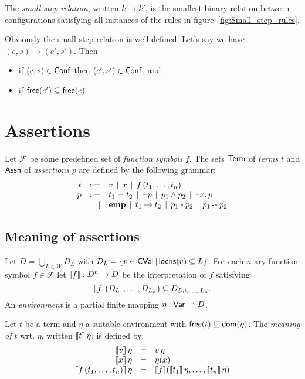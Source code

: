 \documentclass[12pt,a4paper]{article}
\newcommand{\CVal}{\sstyle{CVal}}
\newcommand{\Conf}{\sstyle{Conf}}
\newcommand{\emp}{\ensuremath{\mathbf{emp}}}
\begin{document}
\begin{definition}
  The {\em small step relation}, written $k \to k'$, is the smallest binary relation between configurations
  satisfying all instances of the rules in figure~\ref{fig:Small_step_rules}.
\end{definition}

Obviously the small step relation is well-defined. Let's say we have $(e,s)\to(e',s')$. Then
\begin{itemize}
\item if $(e,s)\in\Conf$ then $(e',s')\in\Conf$, and
\item if $\mathsf{free}(e') \subseteq \mathsf{free}(e)$.
\end{itemize}


\section{Assertions}

\begin{definition}[Assertions]
  Let $\mathcal{F}$ be some predefined set of {\em function symbols} $f$.
  The sets $\mathsf{Term}$ of {\em terms} $t$ and $\mathsf{Assn}$ of {\em assertions} $p$ are defined by the following grammar:
  \[\GRbeg
  t \GRis v \GRmid x \GRmid f\,(t_1,\ldots,t_n)
  \\
  p \GRis t_1 = t_2 \GRmid \neg p \GRmid p_1 \wedge p_2 \GRmid \exists x.\,p
  \GRal \emp \GRmid t_1 \mapsto t_2 \GRmid p_1 \sepcon p_2 \GRmid p_1 \sepimp p_2
  \GRend\]
\end{definition}


\subsection{Meaning of assertions}

Let $D = \bigcup_{L\in W} D_L$ with $D_L = \{v\in\CVal\,|\,\locns{v} \subseteq L\}$.
For each $n$-ary function symbol $f\in\mathcal{F}$ let
$\llbracket f\rrbracket: D^n \to D$ be the interpretation of $f$ satisfying
\[
\llbracket f\rrbracket(D_{L_1},\ldots,D_{L_n}) \subseteq D_{L_1 \cup \ldots \cup L_n}.
\]
An {\em environment} is a partial finite mapping $\eta:\mathsf{Var} \rightharpoonup D$.

\begin{definition}
  Let $t$ be a term and $\eta$ a suitable environment with $\mathsf{free}(t) \subseteq \mathsf{dom}(\eta)$.
  The {\em meaning of $t$} wrt. $\eta$, written $\llbracket t\rrbracket\,\eta$, is defined by:
  \[\begin{array}{rcl}
    \llbracket v\rrbracket\,\eta
    &=& v\,\eta \\
    \llbracket x\rrbracket\,\eta
    &=& \eta(x) \\
    \llbracket f\,(t_1,\ldots,t_n)\rrbracket\,\eta
    &=& \llbracket f\rrbracket(\llbracket t_1\rrbracket\,\eta,\ldots,\llbracket t_n\rrbracket\,\eta)
  \end{array}\]
\end{definition}
\end{document}

